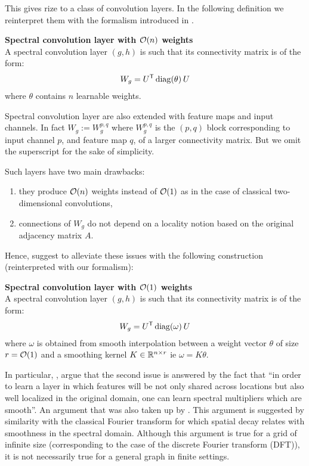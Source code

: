 This gives rize to a class of convolution layers. In the following definition we reinterpret them with the formalism introduced in .

\begin{definition}\textbf{Spectral convolution layer with $\co(n)$ weights}\\
A spectral convolution layer $(g,h)$ is such that its connectivity matrix is of the form:
\begin{gather*}
W_g = U^{\T} \diag(\theta) \h{2} U
\end{gather*}
where $\theta$ contains $n$ learnable weights.
\end{definition}

\begin{remark}Spectral convolution layer are also extended with feature maps and input channels. In fact $W_g := W_g^{p,q}$ where $W_g^{p,q}$ is the $(p,q)$ block corresponding to input channel $p$, and feature map $q$, of a larger connectivity matrix. But we omit the superscript for the sake of simplicity.
\end{remark}

Such layers have two main drawbacks:
\begin{enumerate}
  \item they produce $\co(n)$ weights instead of $\co(1)$ as in the case of classical two-dimensional convolutions,
  \item connections of $W_g$ do not depend on a locality notion based on the original adjacency matrix $A$.
\end{enumerate}

Hence, \cite{bruna2013spectral} suggest to alleviate these issues with the following construction (reinterpreted with our formalism):

\begin{definition}\textbf{Spectral convolution layer with $\co(1)$ weights}\\
A spectral convolution layer $(g,h)$ is such that its connectivity matrix is of the form:
\begin{gather*}
W_g = U^{\T} \diag(\omega) \h{2} U
\end{gather*}
where $\omega$ is obtained from smooth interpolation between a weight vector $\theta$ of size $r = \co(1)$ and a smoothing kernel $K \in \bbr^{n \times r}$ ie $\omega = K \theta$.
\end{definition}

In particular, \cite{bruna2013spectral}, argue that the second issue is answered by the fact that ``in order to learn a layer in which features will be not only shared across locations but also well localized in the original domain, one can learn spectral multipliers which are smooth''. An argument that was also taken up by \cite{henaff2015deep}. This argument is suggested by similarity with the classical Fourier transform for which spatial decay relates with smoothness in the spectral domain. Although this argument is true for a grid of infinite size (corresponding to the case of the discrete Fourier transform (DFT)), it is not necessarily true for a general graph in finite settings.

